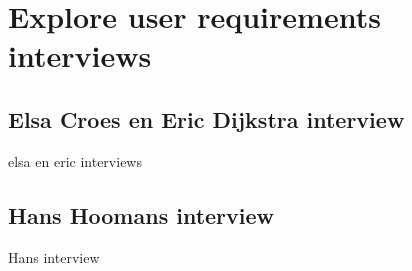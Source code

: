 \chapter{Explore user requirements interviews}
\label{appendix:ExploreUserRequirements}
\section{Elsa Croes en Eric Dijkstra interview}
\label{appendix:ExploreUserRequirementsElsa}
elsa en eric interviews
\section{Hans Hoomans interview}
Hans interview
